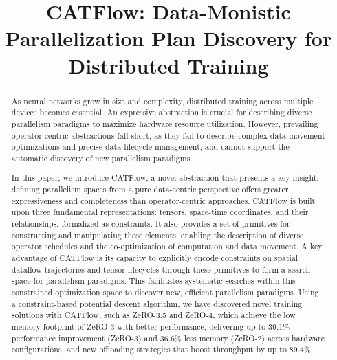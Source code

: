 \documentclass[letterpaper,twocolumn,10pt]{article}
\newcommand{\name}{CATFlow}
\begin{document}

\date{}

\title{\Large \bf \name{}: Data-Monistic Parallelization Plan Discovery for Distributed Training}

\author{
} %

\maketitle

\begin{abstract}
As neural networks grow in size and complexity, distributed training across multiple devices becomes essential. An expressive abstraction is crucial for describing diverse parallelism paradigms to maximize hardware resource utilization. However, prevailing operator-centric abstractions fall short, as they fail to describe complex data movement optimizations and precise data lifecycle management, and cannot support the automatic discovery of new parallelism paradigms.

In this paper, we introduce \name{}, a novel abstraction that presents a key insight: defining parallelism spaces from a pure data-centric perspective offers greater expressiveness and completeness than operator-centric approaches. \name{} is built upon three fundamental representations: tensors, space-time coordinates, and their relationships, formalized as constraints. It also provides a set of primitives for constructing and manipulating these elements, enabling the description of diverse operator schedules and the co-optimization of computation and data movement. A key advantage of \name{} is its capacity to explicitly encode constraints on spatial dataflow trajectories and tensor lifecycles through these primitives to form a search space for parallelism paradigms. This facilitates systematic searches within this constrained optimization space to discover new, efficient parallelism paradigms. Using a constraint-based potential descent algorithm, we have discovered novel training solutions with \name{}, such as ZeRO-3.5 and ZeRO-4, which achieve the low memory footprint of ZeRO-3 with better performance, delivering up to 39.1\% performance improvement (ZeRO-3) and 36.6\% less memory (ZeRO-2) across hardware configurations, and new offloading strategies that boost throughput by up to 89.4\%.

\end{abstract}
\end{document}
